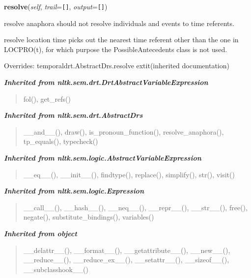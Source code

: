 \hspace{.8\funcindent}\begin{boxedminipage}{\funcwidth}

    \raggedright \textbf{resolve}(\textit{self}, \textit{trail}={\tt \texttt{[}\texttt{]}}, \textit{output}={\tt \texttt{[}\texttt{]}})

\setlength{\parskip}{2ex}
    resolve anaphora should not resolve individuals and events to time 
    referents.

    resolve location time picks out the nearest time referent other than 
    the one in LOCPRO(t), for which purpose the PossibleAntecedents class 
    is not used.

\setlength{\parskip}{1ex}
      Overrides: temporaldrt.AbstractDrs.resolve 	extit{(inherited documentation)}

    \end{boxedminipage}


\large{\textbf{\textit{Inherited from nltk.sem.drt.DrtAbstractVariableExpression}}}

\begin{quote}
fol(), get\_refs()
\end{quote}

\large{\textbf{\textit{Inherited from nltk.sem.drt.AbstractDrs}}}

\begin{quote}
\_\_and\_\_(), draw(), is\_pronoun\_function(), resolve\_anaphora(), tp\_equals(), typecheck()
\end{quote}

\large{\textbf{\textit{Inherited from nltk.sem.logic.AbstractVariableExpression}}}

\begin{quote}
\_\_eq\_\_(), \_\_init\_\_(), findtype(), replace(), simplify(), str(), visit()
\end{quote}

\large{\textbf{\textit{Inherited from nltk.sem.logic.Expression}}}

\begin{quote}
\_\_call\_\_(), \_\_hash\_\_(), \_\_neq\_\_(), \_\_repr\_\_(), \_\_str\_\_(), free(), negate(), substitute\_bindings(), variables()
\end{quote}

\large{\textbf{\textit{Inherited from object}}}

\begin{quote}
\_\_delattr\_\_(), \_\_format\_\_(), \_\_getattribute\_\_(), \_\_new\_\_(), \_\_reduce\_\_(), \_\_reduce\_ex\_\_(), \_\_setattr\_\_(), \_\_sizeof\_\_(), \_\_subclasshook\_\_()
\end{quote}

